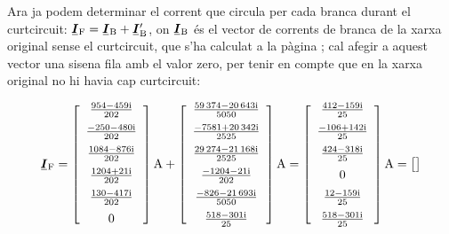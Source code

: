 \begin{exemple}
	Ara ja podem determinar el corrent que circula per cada branca durant el curtcircuit: $\mcmplx{I}\ped{F} = \mcmplx{I}\ped{B} + \mcmplx{I}'\ped{B}$, on $\mcmplx{I}\ped{B}$ és el vector de corrents de branca de la xarxa original sense el curtcircuit, que s'ha calculat a la pàgina \pageref{eq:ib-exemp}; cal afegir a aquest vector una sisena fila amb el valor zero, per tenir en compte que en la xarxa original no hi havia cap curtcircuit:
	
	\[
	\mcmplx{I}\ped{F} =
	\begin{bmatrix}\begin{array}{c}
		\frac{\complexnum{ 954 - j 459}}{202} \\[2mm]
		\frac{\complexnum{-250 - j 480}}{202}  \\[2mm]
		\frac{\complexnum{1084 - j 876}}{202} \\[2mm]
		\frac{\complexnum{1204 + j 21}}{202}  \\[2mm]
		\frac{\complexnum{130 - j 417}}{202} \\[2mm]
		0
	\end{array}\end{bmatrix}\unit{A} +	
	\begin{bmatrix}\begin{array}{c}
			\frac{\complexnum{ 59374 - j 20643}}{5050} \\[2mm]
			\frac{\complexnum{-7581 + j 20342}}{2525}  \\[2mm]
			\frac{\complexnum{29274 - j 21168}}{2525} \\[2mm]
			\frac{\complexnum{-1204 - j 21}}{202}  \\[2mm]
			\frac{\complexnum{-826 - j 21693}}{5050} \\[2mm]
			\frac{\complexnum{518 - j 301}}{25}
	\end{array}\end{bmatrix}\unit{A} = 
	\begin{bmatrix}\begin{array}{c}
			\frac{\complexnum{ 412 - j 159}}{25} \\[2mm]
			\frac{\complexnum{-106 + j 142}}{25}  \\[2mm]
			\frac{\complexnum{424 - j 318}}{25} \\[2mm]
			0  \\[2mm]
			\frac{\complexnum{12 - j 159}}{25} \\[2mm]
			\frac{\complexnum{518 - j 301}}{25}
	\end{array}\end{bmatrix}\unit{A} =
	\begin{bmatrix}\begin{array}{c}

\end{array}
\end{bmatrix}\]
\end{exemple}
